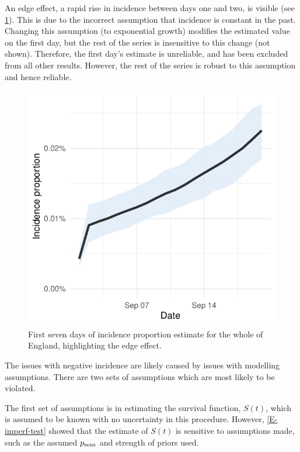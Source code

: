 \documentclass[thesis.tex]{subfiles}
\begin{document}
An edge effect, a rapid rise in incidence between days one and two, is visible (see \cref{transmission:fig:backcalc-start-effect}).
This is due to the incorrect assumption that incidence is constant in the past.
Changing this assumption (\eg to exponential growth) modifies the estimated value on the first day, but the rest of the series is insensitive to this change (not shown).
Therefore, the first day's estimate is unreliable, and has been excluded from all other results.
However, the rest of the series is robust to this assumption and hence reliable.
\begin{figure}
    \centering \includegraphics{transmission/backcalc-start-effect}
    \caption[Edge effects in backcalculation method]{%
        First seven days of incidence proportion estimate for the whole of England, highlighting the edge effect.
    }
    \label{transmission:fig:backcalc-start-effect}
\end{figure}

The issues with negative incidence are likely caused by issues with modelling assumptions.
There are two sets of assumptions which are most likely to be violated.

The first set of assumptions is in estimating the survival function, $S(t)$, which is assumed to be known with no uncertainty in this procedure.
However, \cref{E-imperf-test} showed that the estimate of $S(t)$ is sensitive to assumptions made, such as the assumed $p_\text{sens}$ and strength of priors used.
\end{document}
